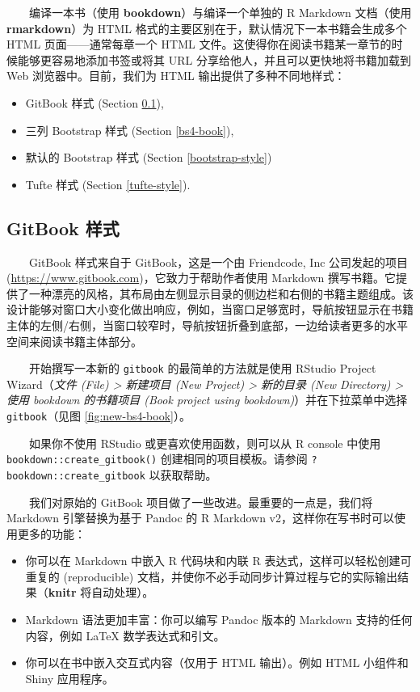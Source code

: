 \documentclass[
  12pt,
]{krantz}
\providecommand{\tightlist}{%
  \setlength{\itemsep}{0pt}\setlength{\parskip}{0pt}}
\theoremstyle{definition}
\theoremstyle{definition}
\theoremstyle{definition}
\theoremstyle{definition}
\theoremstyle{remark}
\begin{document}
  编译一本书（使用 \textbf{bookdown}）与编译一个单独的 R Markdown 文档（使用 \textbf{rmarkdown}）为 HTML 格式的主要区别在于，默认情况下一本书籍会生成多个 HTML 页面------通常每章一个 HTML 文件。这使得你在阅读书籍某一章节的时候能够更容易地添加书签或将其 URL 分享给他人，并且可以更快地将书籍加载到 Web 浏览器中。目前，我们为 HTML 输出提供了多种不同地样式：

\begin{itemize}
\tightlist
\item
  GitBook 样式 (Section \ref{gitbook-style}),
\item
  三列 Bootstrap 样式 (Section \ref{bs4-book}),
\item
  默认的 Bootstrap 样式 (Section \ref{bootstrap-style})
\item
  Tufte 样式 (Section \ref{tufte-style}).
\end{itemize}

\hypertarget{gitbook-style}{%
\subsection{GitBook 样式}\label{gitbook-style}}

  GitBook 样式来自于 GitBook，这是一个由 Friendcode, Inc 公司发起的项目 (\url{https://www.gitbook.com})，它致力于帮助作者使用 Markdown 撰写书籍。它提供了一种漂亮的风格，其布局由左侧显示目录的侧边栏和右侧的书籍主题组成。该设计能够对窗口大小变化做出响应，例如，当窗口足够宽时，导航按钮显示在书籍主体的左侧/右侧，当窗口较窄时，导航按钮折叠到底部，一边给读者更多的水平空间来阅读书籍主体部分。

  开始撰写一本新的 \texttt{gitbook} 的最简单的方法就是使用 RStudio Project Wizard（\emph{文件 (File) \textgreater{} 新建项目 (New Project) \textgreater{} 新的目录 (New Directory) \textgreater{} 使用 bookdown 的书籍项目 (Book project using bookdown)}）并在下拉菜单中选择 \texttt{gitbook}（见图 \ref{fig:new-bs4-book}）。

  如果你不使用 RStudio 或更喜欢使用函数，则可以从 R console 中使用 \texttt{bookdown::create\_gitbook()} 创建相同的项目模板。请参阅 \texttt{?bookdown::create\_gitbook} 以获取帮助。

  我们对原始的 GitBook 项目做了一些改进。最重要的一点是，我们将 Markdown 引擎替换为基于 Pandoc 的 R Markdown v2，这样你在写书时可以使用更多的功能：

\begin{itemize}
\tightlist
\item
  你可以在 Markdown 中嵌入 R 代码块和内联 R 表达式，这样可以轻松创建可重复的 (reproducible) 文档，并使你不必手动同步计算过程与它的实际输出结果（\textbf{knitr} 将自动处理）。
\item
  Markdown 语法更加丰富：你可以编写 Pandoc 版本的 Markdown 支持的任何内容，例如 LaTeX 数学表达式和引文。
\item
  你可以在书中嵌入交互式内容（仅用于 HTML 输出）。例如 HTML 小组件和 Shiny 应用程序。
\end{itemize}
\end{document}
